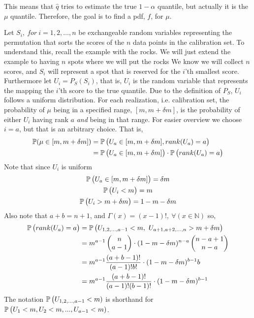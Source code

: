 This means that $\hat q$ tries to estimate the true $1-\alpha$ quantile, but actually it is the $\mu$ quantile. Therefore, the goal is to find a pdf, $f$, for $\mu$.

Let $S_i,~for~ i=1,2,\dots,n$ be exchangeable random variables representing the permutation that sorts the scores of the $n$ data points in the calibration set. To understand this, recall the example with the rocks. We will just extend the example to having $n$ spots where we will put the rocks We know we will collect $n$ scores, and $S_i$ will represent a spot that is reserved for the $i$'th smallest score. Furthermore let $U_i = P_S(S_i)$, that is, $U_i$ is the random variable that represents the mapping the $i$'th score to the true quantile. Due to the definition of $P_S$, $U_i$ follows a uniform distribution. For each realization, i.e. calibration set, the probability of $\mu$ being in a specified range, $[m, m+\delta m]$, is the probability of either $U_i$ having rank $a$ \textit{and} being in that range. For easier overview we choose $i=a$, but that is an arbitrary choice. That is,
\begin{align}
    \operatorname*{\mathbb{P}}(\mu \in [m,m+\delta m])
    \nonumber
    &= \operatorname*{\mathbb{P}}\big(U_a \in [m,m+\delta m] , rank(U_a) = a\big)\\
    &= \operatorname*{\mathbb{P}}\big(U_a \in [m,m+\delta m]\big)\cdot \operatorname*{\mathbb{P}}\big(rank(U_a) = a\big)
    \label{eq: prob mu in range}
\end{align}
Note that since $U_i$ is uniform
\begin{gather}
    \operatorname*{\mathbb{P}}\big(U_a \in [m,m+\delta m]\big) = \delta m
    \label{eq: prob Ua in range}\\
    \nonumber
    \operatorname*{\mathbb{P}}\big(U_i < m\big) = m\\
    \nonumber
    \operatorname*{\mathbb{P}}\big(U_i > m + \delta m\big) = 1-m-\delta m
\end{gather}
Also note that $a+b=n+1$, and  $\Gamma(x) = (x-1)!,~ \forall(x\in\mathbb{N})$ so,
\begin{align}
    \nonumber
    \operatorname*{\mathbb{P}}\big(rank(U_a) = a\big)
    &= \operatorname*{\mathbb{P}}\big(U_{1,2,...,a-1} < m , ~U_{a+1,a+2,...,n} > m+\delta m\big)\\
    \nonumber
    &= m^{a-1}\begin{pmatrix}n\\a-1\end{pmatrix}    \cdot (1-m-\delta m)^{n-a} \begin{pmatrix}n-a+1\\n-a\end{pmatrix}\\
    \nonumber
    &= m^{a-1} \frac{(a+b-1)!}{(a-1)!b!}\cdot (1-m-\delta m)^{b-1}b\\
    &= m^{a-1} \frac{(a+b-1)!}{(a-1)!(b-1)!}\cdot (1-m-\delta m)^{b-1}
    \label{eq: prob rank Ua = a}
\end{align}
The notation $\operatorname*{\mathbb{P}}\big(U_{1,2,...,a-1} < m)$ is shorthand for $\operatorname*{\mathbb{P}}\big(U_1 < m, U_2 < m, ... , U_{a-1} < m)$.

